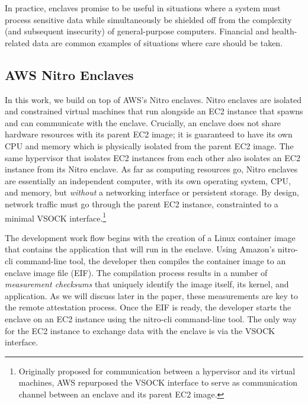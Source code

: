 In practice, enclaves promise to be useful in situations where a system must
process sensitive data while simultaneously be shielded off from the complexity
(and subsequent insecurity) of general-purpose computers. Financial and
health-related data are common examples of situations where care should be
taken.

\subsection{AWS Nitro Enclaves}
\label{sec:nitro}

In this work, we build on top of AWS's Nitro enclaves.  Nitro enclaves are
isolated and constrained virtual machines that run alongside an EC2 instance
that spawns and can communicate with the enclave.  Crucially, an enclave does
not share hardware resources with its parent EC2 image; it is guaranteed to
have its own CPU and memory which is physically isolated from the parent EC2
image.  The same hypervisor that isolates EC2 instances from each other also
isolates an EC2 instance from its Nitro enclave.  As far as computing resources
go, Nitro enclaves are essentially an independent computer, with its own
operating system, CPU, and memory, but \emph{without} a networking
interface or persistent storage.  By design, network traffic must go through the parent EC2 instance,
constrainted to a minimal VSOCK
interface.\footnote{Originally proposed for communication between a hypervisor
and its virtual machines, AWS repurposed the VSOCK interface to serve as
communication channel between an enclave and its parent EC2 image.}

The development work flow begins with the creation of a Linux container image that
contains the application that will run in the enclave.  Using Amazon's
nitro-cli command-line tool, the developer then compiles the container image to an
enclave image file (EIF).  The compilation process results in a number of
\emph{measurement checksums} that uniquely identify the image itself, its
kernel, and application.  As we will discuss later in the paper, these
measurements are key to the remote attestation process.
%
Once the EIF is ready, the developer starts the enclave on an EC2 instance
using the nitro-cli command-line tool.  The only way for the EC2 instance to
exchange data with the enclave is via the VSOCK interface.

